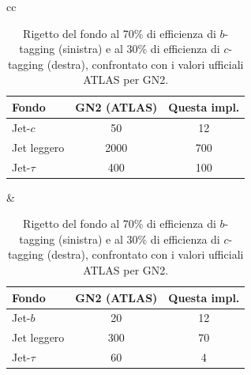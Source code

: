 \documentclass[11pt,a4paper]{article}
\begin{document}
\begin{table}[!ht]
    \centering
    \begin{tabular}{cc}
        \begin{tabular}{lcc}
            \toprule
            Fondo & GN2 (ATLAS) & Questa impl. \\
            \midrule
            Jet-$c$     & 50   & 12  \\
            Jet leggero & 2000 & 700 \\
            Jet-$\tau$  & 400  & 100 \\
            \bottomrule
        \end{tabular}
        &
        \begin{tabular}{lcc}
            \toprule
            Fondo & GN2 (ATLAS) & Questa impl. \\
            \midrule
            Jet-$b$     & 20  & 12  \\
            Jet leggero & 300 & 70 \\
            Jet-$\tau$  & 60   & 4  \\
            \bottomrule
        \end{tabular}
    \end{tabular}
    \caption{Rigetto del fondo al 70\% di efficienza di $b$-tagging (sinistra) e al 30\% di efficienza di $c$-tagging (destra), confrontato con i valori ufficiali ATLAS per GN2.}
    \label{tab:rigetti}
\end{table}
\end{document}
